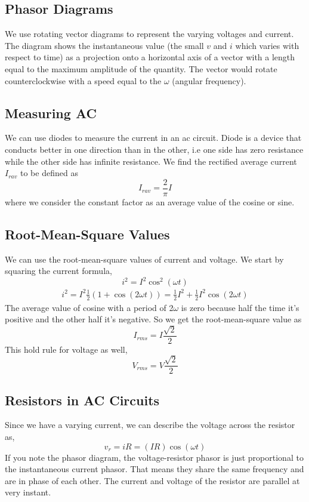 \subsection{Phasor Diagrams}
We use rotating vector diagrams to represent the varying voltages and current. The diagram shows the instantaneous value (the small $v$ and $i$ which varies with respect to time) as a projection
onto a horizontal axis of a vector with a length equal to the maximum amplitude of the quantity. The vector would rotate counterclockwise with a speed equal to the $\omega$ (angular frequency).
\subsection{Measuring AC}
We can use diodes to measure the current in an ac circuit. Diode is a device that conducts better in one direction than in the other, i.e one side has zero resistance while the other side has infinite resistance. We find the rectified average current $I_{rav}$ to be defined as 
\begin{equation*}
	I_{rav} = \frac{2}{\pi}I
\end{equation*}
where we consider the constant factor as an average value of the cosine or sine.
\subsection{Root-Mean-Square Values}
We can use the root-mean-square values of current and voltage. We start by squaring the current formula,
\begin{equation*}
		i^2 = I^2\cos^2(\omega t)
\end{equation*}
\begin{align*}
	i^2 = I^2\frac{1}{2}(1+\cos(2\omega t)) = \frac{1}{2}I^2 + \frac{1}{2}I^2\cos(2\omega t)
\end{align*}
The average value of cosine with a period of 2$\omega$ is zero because half the time it's positive and the other half it's negative.
So we get the root-mean-square value as 
\begin{equation*}
	I_{rms} = I\frac{\sqrt{2}}{2}
\end{equation*}
This hold rule for voltage as well,
\begin{equation*}
	V_{rms} = V\frac{\sqrt{2}}{2}
\end{equation*}
\subsection{Resistors in AC Circuits}
Since we have a varying current, we can describe the voltage across the resistor as,
\begin{equation*}
	v_{r} = iR = (IR)\cos(\omega t) 
\end{equation*}	
If you note the phasor diagram, the voltage-resistor phasor is just proportional to the instantaneous current phasor. That means they share the same frequency and are in phase of each other. 
The current and voltage of the resistor are parallel at very instant.  
